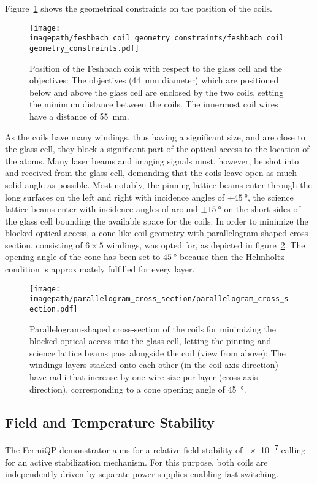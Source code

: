 Figure~\ref{fig:feshbach_coil_geometry_constraints} shows the geometrical constraints on the position of the coils.

\begin{figure}
    \centering
    \texttt{[image: \\imagepath/feshbach\_coil\_geometry\_constraints/feshbach\_coil\_geometry\_constraints.pdf]}
    \caption{Position of the Feshbach coils with respect to the glass cell and the objectives: The objectives (\SI{44}{\milli\meter} diameter) which are positioned below and above the glass cell are enclosed by the two coils, setting the minimum distance between the coils. The innermost coil wires have a distance of \SI{55}{\milli\meter}.}
    \label{fig:feshbach_coil_geometry_constraints}
\end{figure}

As the coils have many windings, thus having a significant size, and are close to the glass cell, they block a significant part of the optical access to the location of the atoms. Many laser beams and imaging signals must, however, be shot into and received from the glass cell, demanding that the coils leave open as much solid angle as possible. Most notably, the pinning lattice beams enter through the long surfaces on the left and right with incidence angles of $\pm \SI{45}{\degree}$, the science lattice beams enter with incidence angles of around $\pm \SI{15}{\degree}$ on the short sides of the glass cell bounding the available space for the coils. In order to minimize the blocked optical access, a cone-like coil geometry with parallelogram-shaped cross-section, consisting of $6 \times 5$ windings, was opted for, as depicted in figure~\ref{fig:parallelogram_cross_section}. The opening angle of the cone has been set to $\SI{45}{\degree}$ because then the Helmholtz condition is approximately fulfilled for every layer.
\begin{figure}
    \centering
    \texttt{[image: \\imagepath/parallelogram\_cross\_section/parallelogram\_cross\_section.pdf]}
    \caption{Parallelogram-shaped cross-section of the coils for minimizing the blocked optical access into the glass cell, letting the pinning and science lattice beams pass alongside the coil (view from above): The windings layers stacked onto each other (in the coil axis direction) have radii that increase by one wire size per layer (cross-axis direction), corresponding to a cone opening angle of \SI[]{45}{\degree}.}
    \label{fig:parallelogram_cross_section}
\end{figure}

\subsection*{Field and Temperature Stability}
The FermiQP demonstrator aims for a relative field stability of \SI{e-7}{} calling for an active stabilization mechanism. For this purpose, both coils are independently driven by separate power supplies enabling fast switching.

